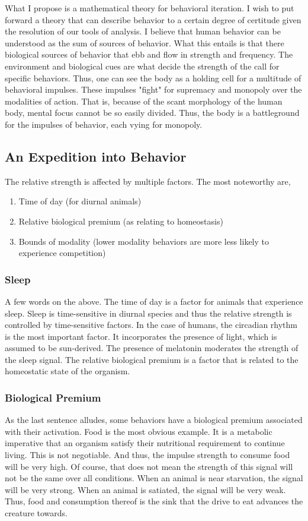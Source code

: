 \documentclass[12pt]{article}
\begin{document}
What I propose is a mathematical theory for behavioral iteration.
I wish to put forward a theory that can describe behavior to a certain degree of certitude given the resolution of our tools of analysis.
I believe that human behavior can be understood as the sum of sources of behavior.
What this entails is that there biological sources of behavior that ebb and flow in strength and frequency.
The environment and biological cues are what decide the strength of the call for specific behaviors.
Thus, one can see the body as a holding cell for a multitude of behavioral impulses.
These impulses "fight" for supremacy and monopoly over the modalities of action.
That is, because of the scant morphology of the human body, mental focus cannot be so easily divided.
Thus, the body is a battleground for the impulses of behavior, each vying for monopoly.

\subsection{An Expedition into Behavior}

The relative strength is affected by multiple factors. The most noteworthy are,
\begin{enumerate}
    \item Time of day (for diurnal animals)
    \item Relative biological premium (as relating to homeostasis)
    \item Bounds of modality (lower modality behaviors are more less likely to experience competition)
\end{enumerate}

\subsubsection{Sleep}
A few words on the above.
The time of day is a factor for animals that experience sleep.
Sleep is time-sensitive in diurnal species and thus the relative strength is controlled by time-sensitive factors.
In the case of humans, the circadian rhythm is the most important factor.
It incorporates the presence of light, which is assumed to be sun-derived.
The presence of melatonin moderates the strength of the sleep signal.
The relative biological premium is a factor that is related to the homeostatic state of the organism.

\subsubsection{Biological Premium}
As the last sentence alludes, some behaviors have a biological premium associated with their activation.
Food is the most obvious example.
It is a metabolic imperative that an organism satisfy their nutritional requirement to continue living.
This is not negotiable.
And thus, the impulse strength to consume food will be very high.
Of course, that does not mean the strength of this signal will not be the same over all conditions.
When an animal is near starvation, the signal will be very strong.
When an animal is satiated, the signal will be very weak.
Thus, food and consumption thereof is the sink that the drive to eat advances the creature towards.
\end{document}
